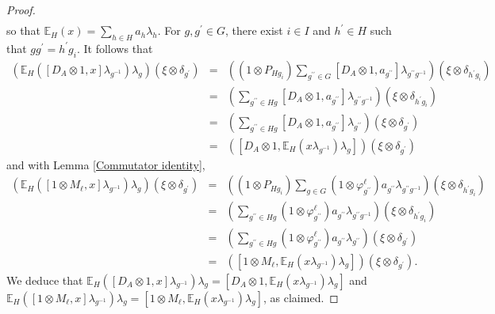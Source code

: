 \documentclass[10pt,a4paper]{amsart}
\begin{document}
\begin{proof}
\begin{eqnarray}
\end{eqnarray}
so that $\mathbb{E}_{H}(x)=\sum_{h\in H}a_{h}\lambda_{h}$. For $g,g^{\prime}\in G$,
there exist $i\in I$ and $h^{\prime}\in H$ such that $gg^{\prime}=h^{\prime}g_{i}$.
It follows that
\begin{eqnarray}
\nonumber
\left(\mathbb{E}_{H}([D_{A}\otimes1,x]\lambda_{g^{-1}})\lambda_{g}\right)(\xi\otimes\delta_{g^{\prime}}) &=& ((1\otimes P_{Hg_{i}})\sum_{g^{\prime\prime}\in G}[D_{A}\otimes1,a_{g^{\prime\prime}}]\lambda_{g^{\prime\prime}g^{-1}})(\xi\otimes\delta_{h^{\prime}g_{i}}) \\
\nonumber
&=& (\sum_{g^{\prime\prime}\in Hg}[D_{A}\otimes1,a_{g^{\prime\prime}}]\lambda_{g^{\prime\prime}g^{-1}})(\xi\otimes\delta_{h^{\prime}g_{i}}) \\
\nonumber
&=& (\sum_{g^{\prime\prime}\in Hg}[D_{A}\otimes1,a_{g^{\prime\prime}}]\lambda_{g^{\prime\prime}})(\xi\otimes\delta_{g^{\prime}}) \\
\nonumber
&=& \left([D_{A}\otimes1,\mathbb{E}_{H}(x\lambda_{g^{-1}})\lambda_{g}]\right)(\xi\otimes\delta_{g^{\prime}})
\end{eqnarray}
and with Lemma \ref{Commutator identity},
\begin{eqnarray}
\nonumber
\left(\mathbb{E}_{H}([1\otimes M_{\ell},x]\lambda_{g^{-1}})\lambda_{g}\right)(\xi\otimes\delta_{g^{\prime}}) &=& ((1\otimes P_{Hg_{i}})\sum_{g\in G}(1\otimes\varphi_{g^{\prime\prime}}^{\ell})a_{g^{\prime\prime}}\lambda_{g^{\prime\prime}g^{-1}})(\xi\otimes\delta_{h^{\prime}g_{i}}) \\
\nonumber
&=& (\sum_{g^{\prime\prime}\in Hg}(1\otimes\varphi_{g^{\prime\prime}}^{\ell})a_{g^{\prime\prime}}\lambda_{g^{\prime\prime}g^{-1}})(\xi\otimes\delta_{h^{\prime}g_{i}}) \\
\nonumber
&=& (\sum_{g^{\prime\prime}\in Hg}(1\otimes\varphi_{g^{\prime\prime}}^{\ell})a_{g^{\prime\prime}}\lambda_{g^{\prime\prime}})(\xi\otimes\delta_{g^{\prime}}) \\
\nonumber
&=& ([1\otimes M_{\ell},\mathbb{E}_{H}(x\lambda_{g^{-1}})\lambda_{g}])(\xi\otimes\delta_{g^{\prime}}).
\end{eqnarray}
We deduce that $\mathbb{E}_{H}([D_{A}\otimes1,x]\lambda_{g^{-1}})\lambda_{g}=[D_{A}\otimes1,\mathbb{E}_{H}(x\lambda_{g^{-1}})\lambda_{g}]$
and $\mathbb{E}_{H}([1\otimes M_{\ell},x]\lambda_{g^{-1}})\lambda_{g}=[1\otimes M_{\ell},\mathbb{E}_{H}(x\lambda_{g^{-1}})\lambda_{g}]$,
as claimed. \end{proof}
\end{document}
